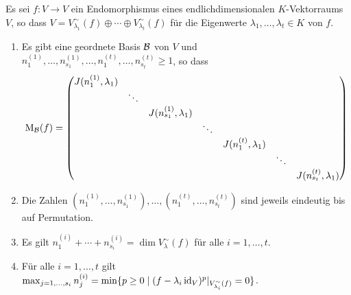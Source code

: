 \begin{theorem}\label{thrm: general Jordan normal form}
  Es sei $f \colon V \to V$ ein Endomorphismus eines endlichdimensionalen $K$-Vektorraums $V$, so dass $V = V^\sim_{\lambda_1}(f) \oplus \dotsb \oplus V^\sim_{\lambda_t}(f)$ für die Eigenwerte $\lambda_1, \dotsc, \lambda_t \in K$ von $f$.
  \begin{enumerate}[leftmargin=*, label=\roman*)]
    \item
      Es gibt eine geordnete Basis $\mathcal{B}$ von $V$ und $n^{(1)}_1, \dotsc, n^{(1)}_{s_1}, \dotsc, n^{(t)}_1, \dotsc, n^{(t)}_{s_t} \geq 1$, so dass
      \[
        \mathrm{M}_{\mathcal{B}}(f)
        =
        \begin{pmatrix}
          J(n^{(1)}_1, \lambda_1) &         &                             &         &                         &         &                             \\
                                  & \ddots  &                             &         &                         &         &                             \\
                                  &         & J(n^{(1)}_{s_1}, \lambda_1) &         &                         &         &                             \\
                                  &         &                             & \ddots  &                         &         &                             \\
                                  &         &                             &         & J(n^{(t)}_1, \lambda_1) &         &                             \\
                                  &         &                             &         &                         & \ddots  &                             \\
                                  &         &                             &         &                         &         & J(n^{(t)}_{s_t}, \lambda_1)
        \end{pmatrix}
      \]
    \item
      Die Zahlen $(n^{(1)}_1, \dotsc, n^{(1)}_{s_1}), \dotsc, (n^{(t)}_1, \dotsc, n^{(t)}_{s_t})$ sind jeweils eindeutig bis auf Permutation.
    \item
      Es gilt $n^{(i)}_1 + \dotsb + n^{(i)}_{s_i} = \dim V^\sim_\lambda(f)$ für alle $i = 1, \dotsc, t$.
    \item
      Für alle $i = 1, \dotsc, t$ gilt $\max_{j=1,\dotsc,s_i} n^{(i)}_j = \min \{p \geq 0 \mid (f - \lambda_i \operatorname{id}_V)^p|_{V^\sim_{\lambda_i}(f)} = 0\}$.
  \end{enumerate}
\end{theorem}


